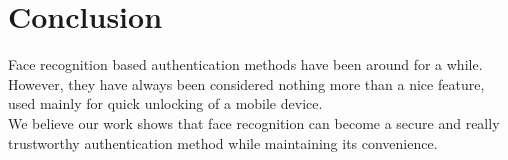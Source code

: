 \section{Conclusion}
    Face recognition based authentication methods have been around for a while. However,
    they have always been considered nothing more than a nice feature, used mainly for
    quick unlocking of a mobile device.\\
    We believe our work shows that face recognition can
    become a secure and really trustworthy authentication method while maintaining
    its convenience.
